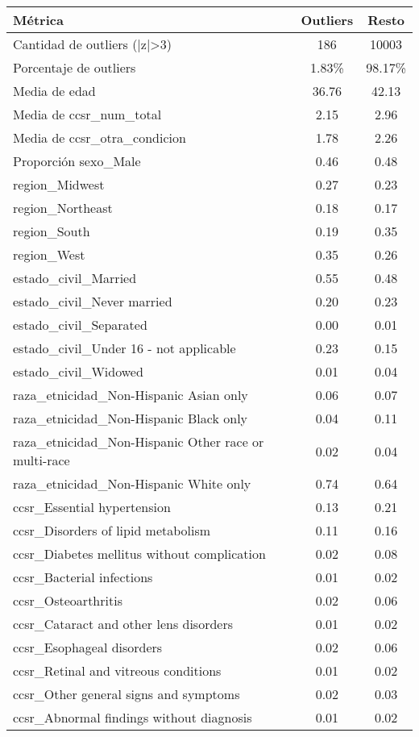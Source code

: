 \documentclass[12pt]{article}
\begin{document}
\begin{longtable}{|l|c|c|}
\hline
\textbf{Métrica} & \textbf{Outliers} & \textbf{Resto} \\
\hline
Cantidad de outliers (|z|>3) & 186 & 10003 \\
Porcentaje de outliers & 1.83\% & 98.17\% \\
Media de edad & 36.76 & 42.13 \\
Media de ccsr\_num\_total & 2.15 & 2.96 \\
Media de ccsr\_otra\_condicion & 1.78 & 2.26 \\
Proporción sexo\_Male & 0.46 & 0.48 \\
region\_Midwest & 0.27 & 0.23 \\
region\_Northeast & 0.18 & 0.17 \\
region\_South & 0.19 & 0.35 \\
region\_West & 0.35 & 0.26 \\
estado\_civil\_Married & 0.55 & 0.48 \\
estado\_civil\_Never married & 0.20 & 0.23 \\
estado\_civil\_Separated & 0.00 & 0.01 \\
estado\_civil\_Under 16 - not applicable & 0.23 & 0.15 \\
estado\_civil\_Widowed & 0.01 & 0.04 \\
raza\_etnicidad\_Non-Hispanic Asian only & 0.06 & 0.07 \\
raza\_etnicidad\_Non-Hispanic Black only & 0.04 & 0.11 \\
raza\_etnicidad\_Non-Hispanic Other race or multi-race & 0.02 & 0.04 \\
raza\_etnicidad\_Non-Hispanic White only & 0.74 & 0.64 \\
ccsr\_Essential hypertension & 0.13 & 0.21 \\
ccsr\_Disorders of lipid metabolism & 0.11 & 0.16 \\
ccsr\_Diabetes mellitus without complication & 0.02 & 0.08 \\
ccsr\_Bacterial infections & 0.01 & 0.02 \\
ccsr\_Osteoarthritis & 0.02 & 0.06 \\
ccsr\_Cataract and other lens disorders & 0.01 & 0.02 \\
ccsr\_Esophageal disorders & 0.02 & 0.06 \\
ccsr\_Retinal and vitreous conditions & 0.01 & 0.02 \\
ccsr\_Other general signs and symptoms & 0.02 & 0.03 \\
ccsr\_Abnormal findings without diagnosis & 0.01 & 0.02 \\
\hline
\end{longtable}
\end{document}
